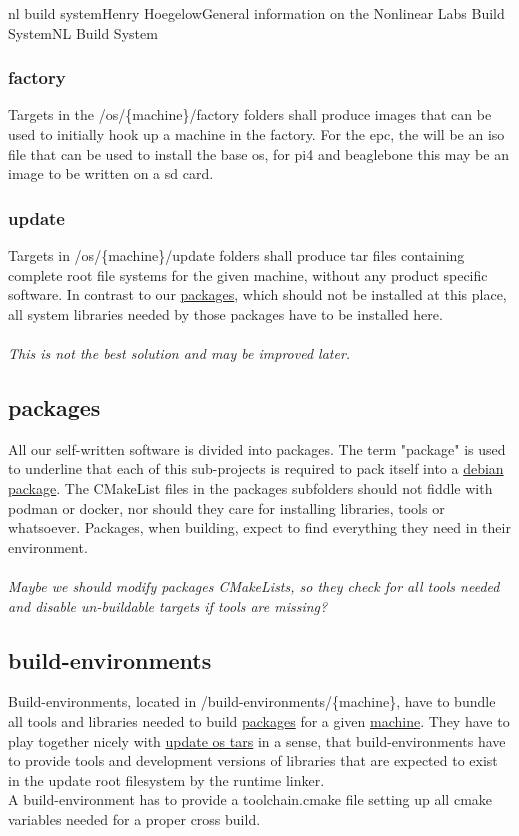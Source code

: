 \documentclass[11pt]{article}
\begin{document}
\begin{Name}{1}{nl build system}{Henry Hoegelow}{General information on the Nonlinear Labs Build System}{NL Build System}
\subsubsection{factory}
Targets in the /os/\{machine\}/factory folders shall produce images that can be used to initially hook up a machine in the factory. For the epc, the will be an iso file that can be used to install the base os, for pi4 and beaglebone this may be an image to be written on a sd card.

\subsubsection{update} \label{os-update}
Targets in /os/\{machine\}/update folders shall produce tar files containing complete root file systems for the given machine, without any product specific software. In contrast to our \hyperref[packages]{packages}, which should not be installed at this place, all system libraries needed by those packages have to be installed here.\\
\\
\emph{This is not the best solution and may be improved later.}

\subsection{packages} \label{packages}
All our self-written software is divided into packages. The term "package" is used to underline that each of this sub-projects is required to pack itself into a \hyperref[cmake-package]{debian package}. The CMakeList files in the packages subfolders should not fiddle with podman or docker, nor should they care for installing libraries, tools or whatsoever. Packages, when building, expect to find everything they need in their environment.\\
\\
\emph{Maybe we should modify packages CMakeLists, so they check for all tools needed and disable un-buildable targets if tools are missing?}

\subsection{build-environments} \label{buildenv}
Build-environments, located in /build-environments/\{machine\}, have to bundle all tools and libraries needed to build \hyperref[packages]{packages} for a given \hyperref[machine]{machine}. They have to play together nicely with \hyperref[os-update]{update os tars} in a sense, that build-environments have to provide tools and development versions of libraries that are expected to exist in the update root filesystem by the runtime linker.\\
A build-environment has to provide a toolchain.cmake file setting up all cmake variables needed for a proper cross build.


\end{Name}
\end{document}
